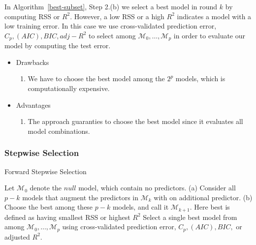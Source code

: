 \documentclass[12pt,a4paper]{article}%
\theoremstyle{definition}
\theoremstyle{plain}
\numberwithin{equation}{section}
\newcounter{subsubsubsection}[subsubsection]
\begin{document}
In Algorithm~\ref{best-subset}, Step 2.(b) we select a best model in round $k$ by computing RSS or $R^{2}$. However, a low RSS or a high $R^{2}$ indicates a model with a low training error. In this case we use cross-validated prediction error, $C_{p},(AIC),BIC, adj-R^{2}$ to select among $\mathcal{M}_{0},\dots,\mathcal{M}_{p}$ in order to evaluate our model by computing the test error.

\begin{itemize}
\item Drawbacks
\begin{enumerate}
	\item We have to choose the best model among the $2^{p}$ models, which is computationally expensive.
\end{enumerate}
\end{itemize}

\begin{itemize}
\item Advantages
\begin{enumerate}
	\item The approach guaranties to choose the best model since it evaluates all model combinations.
\end{enumerate}
\end{itemize}

\subsubsection{\textbf{Stepwise Selection}}

\begin{algorithm}[H]
\caption{Forward Stepwise Selection}\label{forward-stepwise}
\begin{algorithmic}[1]
\State Let $\mathcal{M}_{0}$ denote the $null$ model, which contain no predictors. 
\State (a) Consider all $p-k$ models that augment the predictors in $\mathcal{M}_{k}$ with on additional predictor.
\State (b) Choose the best among these $p-k$ models, and call it $\mathcal{M}_{k+1}$. Here best is defined as having smallest RSS or highest $R^{2}$
\EndFor
\State Select a single best model from among $\mathcal{M}_{0},\dots,\mathcal{M}_{p}$ using cross-validated prediction error, $C_{p},(AIC),BIC,$ or adjusted $R^{2}$.
\end{algorithmic}
\end{algorithm}
\end{document}
